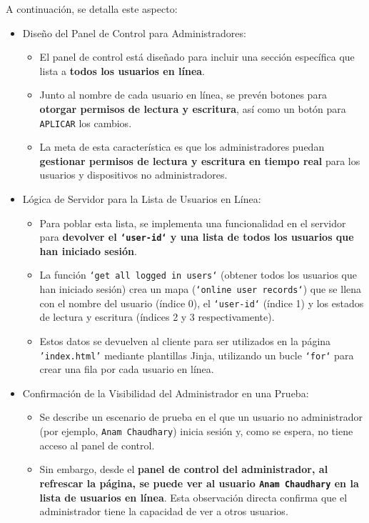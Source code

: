 \documentclass{report}
\begin{document}
A continuación, se detalla este aspecto:
\begin{itemize}
    \item Diseño del Panel de Control para Administradores:
    \begin{itemize}
        \item El panel de control está diseñado para incluir una sección específica que lista a \textbf{todos los usuarios en línea}.
        \item Junto al nombre de cada usuario en línea, se prevén botones para \textbf{otorgar permisos de lectura y escritura}, así como un botón 
              para \texttt{APLICAR} los cambios.
        \item La meta de esta característica es que los administradores puedan \textbf{gestionar permisos de lectura y escritura en tiempo real} para 
              los usuarios y dispositivos no administradores.
    \end{itemize}
    
    \item Lógica de Servidor para la Lista de Usuarios en Línea:
    \begin{itemize}
        \item Para poblar esta lista, se implementa una funcionalidad en el servidor para \textbf{devolver el \texttt{`user-id`} y una lista de todos los 
              usuarios que han iniciado sesión}.
        \item La función \texttt{`get all logged in users`} (obtener todos los usuarios que han iniciado sesión) crea un mapa (\texttt{`online user records`}) 
              que se llena con el nombre del usuario (índice 0), el \texttt{`user-id`} (índice 1) y los estados de lectura y escritura (índices 2 y 3 
              respectivamente).
        \item Estos datos se devuelven al cliente para ser utilizados en la página \texttt{'index.html'} mediante plantillas Jinja, utilizando un 
              bucle \texttt{`for`} para crear una fila por cada usuario en línea.
    \end{itemize}
    
    \item Confirmación de la Visibilidad del Administrador en una Prueba:
    \begin{itemize}
        \item Se describe un escenario de prueba en el que un usuario no administrador (por ejemplo, \texttt{Anam Chaudhary}) inicia sesión 
              y, como se espera, no tiene acceso al panel de control.
        \item Sin embargo, desde el \textbf{panel de control del administrador, al refrescar la página, se puede ver al usuario \texttt{Anam Chaudhary} 
              en la lista de usuarios en línea}. Esta observación directa confirma que el administrador tiene la capacidad de ver a otros usuarios.
    \end{itemize}


\end{itemize}
\end{document}
